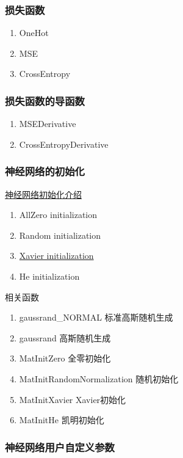\subsubsection{损失函数}
\begin{enumerate}
  \item OneHot
  \item MSE
  \item CrossEntropy
\end{enumerate}

\subsubsection{损失函数的导函数}
\begin{enumerate}
  \item MSEDerivative
  \item CrossEntropyDerivative
\end{enumerate}

\subsubsection{神经网络的初始化}
\href{https://blog.csdn.net/z_feng12489/article/details/102856968}{神经网络初始化介绍}
\begin{enumerate}
  \item AllZero initialization
  \item Random initialization
  \item \href{https://blog.csdn.net/z_feng12489/article/details/102913634}{Xavier initialization}
  \item He initialization
\end{enumerate}


相关函数
\begin{enumerate}
  \item gaussrand\_NORMAL  标准高斯随机生成
  \item gaussrand 高斯随机生成
  \item MatInitZero 全零初始化
  \item MatInitRandomNormalization 随机初始化
  \item MatInitXavier Xavier初始化
  \item MatInitHe 凯明初始化
\end{enumerate}


\subsubsection{神经网络用户自定义参数}

